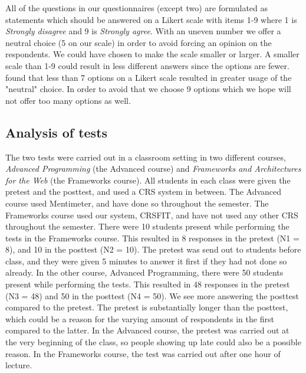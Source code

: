All of the questions in our questionnaires (except two) are formulated as statements which should be answered on a Likert scale \cite{likert1932technique} with items 1-9 where 1 is \emph{Strongly disagree} and 9 is \emph{Strongly agree}. With an uneven number we offer a neutral choice (5 on our scale) in order to avoid forcing an opinion on the respondents. We could have chosen to make the scale smaller or larger. A smaller scale than 1-9 could result in less different answers since the options are fewer.  found that less than 7 options on a Likert scale resulted in greater usage of the "neutral" choice. In order to avoid that we choose 9 options which we hope will not offer too many options as well.




\subsection{Analysis of tests}

The two tests were carried out in a classroom setting in two different courses, \emph{Advanced Programming} (the Advanced course) and \emph{Frameworks and Architectures for the Web} (the Frameworks course). All students in each class were given the pretest and the posttest, and used a CRS system in between. The Advanced course used Mentimeter, and have done so throughout the semester. The Frameworks course used our system, CRSFIT, and have not used any other CRS throughout the semester.
There were 10 students present while performing the tests in the Frameworks course. This resulted in 8 responses in the pretest (N1 = 8), and 10 in the posttest (N2 = 10). The pretest was send out to students before class, and they were given 5 minutes to answer it first if they had not done so already.
In the other course, Advanced Programming, there were 50 students present while performing the tests. This resulted in 48 responses in the pretest (N3 = 48) and 50 in the posttest (N4 = 50). We see more answering the posttest compared to the pretest. The pretest is substantially longer than the posttest, which could be a reason for the varying amount of respondents in the first compared to the latter. In the Advanced course, the pretest was carried out at the very beginning of the class, so people showing up late could also be a possible reason. In the Frameworks course, the test was carried out after one hour of lecture.

